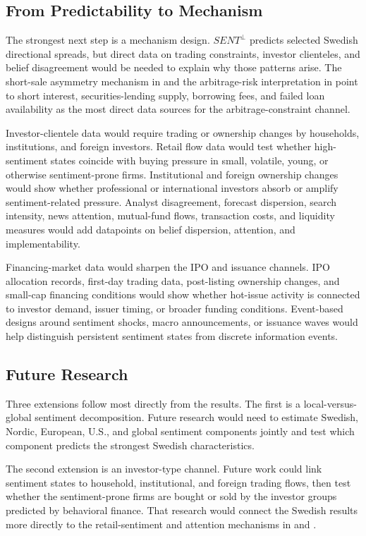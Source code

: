 \documentclass[11pt]{article}
\newcommand{\var}[1]{\ensuremath{#1}}
\begin{document}
\subsection{From Predictability to Mechanism}
The strongest next step is a mechanism design. \var{SENT^{\perp}} predicts selected Swedish directional spreads, but direct data on trading constraints, investor clienteles, and belief disagreement would be needed to explain why those patterns arise. The short-sale asymmetry mechanism in \citet{stambaugh2012short} and the arbitrage-risk interpretation in \citet{stambaugh2015ivol} point to short interest, securities-lending supply, borrowing fees, and failed loan availability as the most direct data sources for the arbitrage-constraint channel.

Investor-clientele data would require trading or ownership changes by households, institutions, and foreign investors. Retail flow data would test whether high-sentiment states coincide with buying pressure in small, volatile, young, or otherwise sentiment-prone firms. Institutional and foreign ownership changes would show whether professional or international investors absorb or amplify sentiment-related pressure. Analyst disagreement, forecast dispersion, search intensity, news attention, mutual-fund flows, transaction costs, and liquidity measures would add datapoints on belief dispersion, attention, and implementability.

Financing-market data would sharpen the IPO and issuance channels. IPO allocation records, first-day trading data, post-listing ownership changes, and small-cap financing conditions would show whether hot-issue activity is connected to investor demand, issuer timing, or broader funding conditions. Event-based designs around sentiment shocks, macro announcements, or issuance waves would help distinguish persistent sentiment states from discrete information events.

\subsection{Future Research}
Three extensions follow most directly from the results. The first is a local-versus-global sentiment decomposition. Future research would need to estimate Swedish, Nordic, European, U.S., and global sentiment components jointly and test which component predicts the strongest Swedish characteristics.

The second extension is an investor-type channel. Future work could link sentiment states to household, institutional, and foreign trading flows, then test whether the sentiment-prone firms are bought or sold by the investor groups predicted by behavioral finance. That research would connect the Swedish results more directly to the retail-sentiment and attention mechanisms in \citet{kumar2006retail} and \citet{barber2008glitters}.
\end{document}
